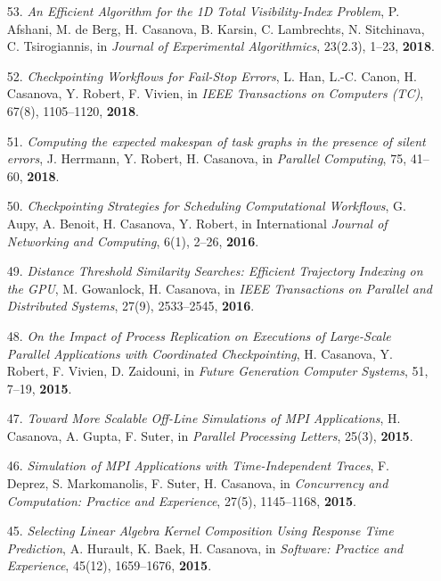 \begin{enumerate}
\item [53.] {\it An Efficient Algorithm for the 1D Total Visibility-Index
Problem}, P. Afshani, M. de Berg, H. Casanova, B. Karsin, C. Lambrechts, N.
        Sitchinava, C. Tsirogiannis, in \emph{Journal of Experimental Algorithmics},
23(2.3), 1--23, {\bf 2018}.

\item [52.] {\it Checkpointing Workflows for Fail-Stop Errors},
L. Han, L.-C. Canon, H. Casanova, Y. Robert, F. Vivien,
        in \emph{IEEE Transactions on Computers (TC)}, 67(8), 1105--1120, {\bf 2018}.

    \item [51.] {\it Computing the expected makespan of task graphs in the presence of silent errors}, J. Herrmann, Y. Robert, H. Casanova,  in \emph{Parallel Computing}, 75, 41--60, {\bf 2018}.

\item [50.] {\it Checkpointing Strategies for Scheduling Computational Workflows}, G. Aupy, A. Benoit, H. Casanova, Y.  Robert, in International
    \emph{Journal of Networking and Computing}, 6(1), 2--26, {\bf 2016}.

\item [49.] {\it Distance Threshold Similarity Searches: Efficient
Trajectory Indexing on the GPU}, M. Gowanlock, H. Casanova, in \emph{IEEE
Transactions on Parallel and Distributed Systems}, 27(9), 2533--2545, {\bf 2016}.

\item [48.] {\it On the Impact of Process Replication on Executions of Large-Scale Parallel Applications with Coordinated Checkpointing},
H. Casanova, Y. Robert, F. Vivien, D. Zaidouni, in \emph{ Future Generation
Computer Systems}, 51, 7--19, {\bf 2015}.

\item [47.] {\it Toward More Scalable Off-Line Simulations of MPI Applications}, H. Casanova, A. Gupta, F. Suter, in \emph{Parallel Processing Letters}, 25(3), {\bf 2015}.

\item [46.] {\it Simulation of MPI Applications with Time-Independent Traces},
F. Deprez, S. Markomanolis, F. Suter, H. Casanova,
in \emph{Concurrency and Computation: Practice and Experience},
27(5), 1145--1168, {\bf 2015}.

\item [45.] {\it Selecting Linear Algebra Kernel Composition Using Response
Time Prediction}, A. Hurault, K. Baek, H. Casanova, in \emph{Software:
Practice and Experience}, 45(12), 1659--1676, {\bf 2015}.


\end{enumerate}
